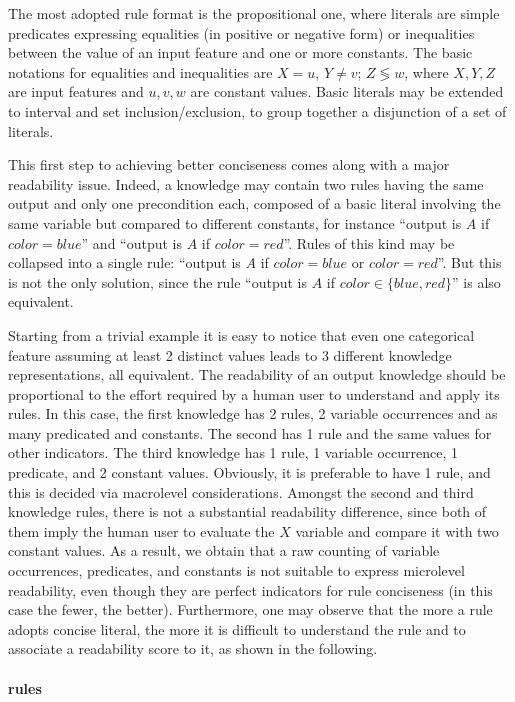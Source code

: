 \documentclass[sigconf]{acmart}
\begin{document}
The most adopted rule format is the propositional one, where literals are simple predicates expressing equalities (in positive or negative form) or inequalities between the value of an input feature and one or more constants.
%
The basic notations for equalities and inequalities are $X = u$, $Y \neq v$; $Z \lessgtr w$, where $X,Y,Z$ are input features and $u,v,w$ are constant values.
%
Basic literals may be extended to interval and set inclusion/exclusion, to group together a disjunction of a set of literals.

This first step to achieving better conciseness comes along with a major readability issue.
%
Indeed, a knowledge may contain two rules having the same output and only one precondition each, composed of a basic literal involving the same variable but compared to different constants, for instance ``output is $A$ if $color=blue$'' and ``output is $A$ if $color=red$''.
%
Rules of this kind may be collapsed into a single rule: ``output is $A$ if $color=blue$ or $color=red$''.
%
But this is not the only solution, since the rule ``output is $A$ if $color \in \{blue,red\}$'' is also equivalent.

Starting from a trivial example it is easy to notice that even one categorical feature assuming at least 2 distinct values leads to 3 different knowledge representations, all equivalent.
%
The readability of an output knowledge should be proportional to the effort required by a human user to understand and apply its rules.
%
In this case, the first knowledge has 2 rules, 2 variable occurrences and as many predicated and constants.
%
The second has 1 rule and the same values for other indicators.
%
The third knowledge has 1 rule, 1 variable occurrence, 1 predicate, and 2 constant values.
%
Obviously, it is preferable to have 1 rule, and this is decided via macrolevel considerations.
%
Amongst the second and third knowledge rules, there is not a substantial readability difference, since both of them imply the human user to evaluate the $X$ variable and compare it with two constant values.
%
As a result, we obtain that a raw counting of variable occurrences, predicates, and constants is not suitable to express microlevel readability, even though they are perfect indicators for rule conciseness (in this case the fewer, the better).
%
Furthermore, one may observe that the more a rule adopts concise literal, the more it is difficult to understand the rule and to associate a readability score to it, as shown in the following.

\paragraph{\mofn{} rules}
\end{document}
